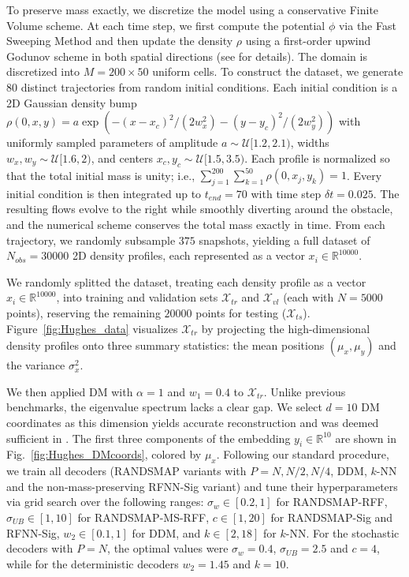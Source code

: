 \documentclass{article}
\begin{document}
To preserve mass exactly, we discretize the model using a conservative Finite Volume scheme. At each time step, we first compute the potential $\phi$ via the Fast Sweeping Method \cite{zhao2005fast} and then update the density $\rho$ using a first-order upwind Godunov scheme in both spatial directions (see \cite{viola2025pde} for details). The domain is discretized into $M=200\times 50$ uniform cells. To construct the dataset, we generate $80$ distinct trajectories from random initial conditions. Each initial condition is a 2D Gaussian density bump $\rho(0,x,y)=a \exp \left( - (x-x_c)^2/(2w_x^2) - (y-y_c)^2/(2w_y^2) \right)$ with uniformly sampled parameters of amplitude $a \sim \mathcal{U}[1.2,2.1)$, widths $w_x,w_y \sim \mathcal{U} [1.6,2)$, and centers $x_c, y_c \sim \mathcal{U} [1.5, 3.5)$. Each profile is normalized so that the total initial mass is unity; i.e., $\sum_{j=1}^{200}\sum_{k=1}^{50} \rho(0,x_j,y_k)=1$. Every initial condition is then integrated up to $t_{end}= 70$ with time step $\delta t=0.025$. The resulting flows evolve to the right while smoothly diverting around the obstacle, and the numerical scheme conserves the total mass exactly in time. From each trajectory, we randomly subsample $375$ snapshots, yielding a full dataset of $N_{obs}=30000$ 2D density profiles, each represented as a vector $x_i\in \mathbb{R}^{10000}$. 

We randomly splitted the dataset, treating each density profile as a vector $x_i\in\mathbb{R}^{10000}$, into training and validation sets $\mathcal{X}_{tr}$ and $\mathcal{X}_{vl}$ (each with $N=5000$ points), reserving the remaining $20000$ points for testing ($\mathcal{X}_{ts}$). Figure~\ref{fig:Hughes_data} visualizes $\mathcal{X}_{tr}$ by projecting the high-dimensional density profiles onto three summary statistics: the mean positions $(\mu_x,\mu_y)$  and the variance $\sigma_x^2$. 

We then applied DM with $\alpha=1$ and $w_1=0.4$ to $\mathcal{X}_{tr}$. Unlike previous benchmarks, the eigenvalue spectrum lacks a clear gap. We select $d=10$ DM coordinates as this dimension yields accurate reconstruction and was deemed sufficient in \cite{viola2025pde}. The first three components of the embedding $y_i\in\mathbb{R}^{10}$ are shown in Fig.~\ref{fig:Hughes_DMcoords}, colored by $\mu_x$. Following our standard procedure, we train all decoders (RANDSMAP variants with $P=N, N/2, N/4$, DDM, $k$-NN and the non-mass-preserving RFNN-Sig variant) and tune their hyperparameters via grid search over the following ranges: $\sigma_w\in[0.2,1]$ for RANDSMAP-RFF, $\sigma_{UB}\in[1,10]$ for RANDSMAP-MS-RFF, $c\in[1,20]$ for RANDSMAP-Sig and RFNN-Sig, $w_2\in[0.1,1]$ for DDM, and $k\in[2,18]$ for $k$-NN. For the stochastic decoders with $P=N$, the optimal values were $\sigma_w=0.4$, $\sigma_{UB}=2.5$ and $c=4$, while for the deterministic decoders $w_2=1.45$ and $k=10$.  
\end{document}
